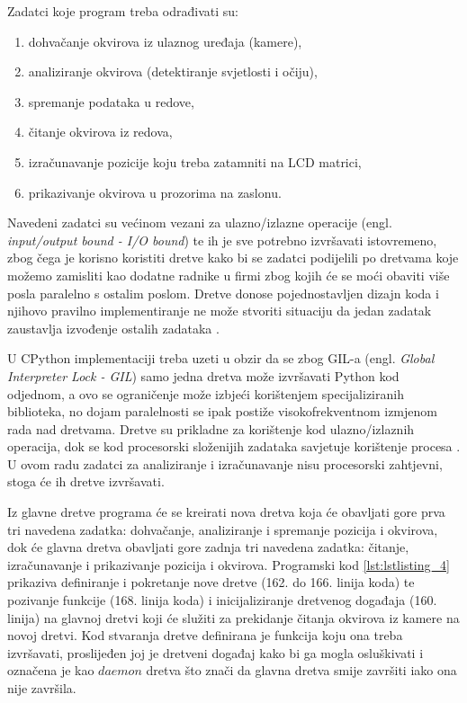 \documentclass{foi}
\begin{document}
\flushleft Zadatci koje program treba odrađivati su:
\begin{enumerate}[noitemsep]
    \item dohvačanje okvirova iz ulaznog uređaja (kamere),
    \item analiziranje okvirova (detektiranje svjetlosti i očiju),
    \item spremanje podataka u redove,
    \item čitanje okvirova iz redova,
    \item izračunavanje pozicije koju treba zatamniti na LCD matrici,
    \item prikazivanje okvirova u prozorima na zaslonu.
\end{enumerate}

\justifying

Navedeni zadatci su većinom vezani za ulazno/izlazne operacije (engl. \emph{input/output bound - I/O bound}) te ih je sve potrebno izvršavati istovremeno, zbog čega je korisno koristiti dretve kako bi se zadatci podijelili po dretvama koje možemo zamisliti kao dodatne radnike u firmi zbog kojih će se moći obaviti više posla paralelno s ostalim poslom. Dretve donose pojednostavljen dizajn koda i njihovo pravilno implementiranje ne može stvoriti situaciju da jedan zadatak zaustavlja izvođenje ostalih zadataka \cite{AndersonJim}.

U CPython implementaciji treba uzeti u obzir da se zbog GIL-a (engl. \emph{Global Interpreter Lock - GIL}) samo jedna dretva može izvršavati Python kod odjednom, a ovo se ograničenje može izbjeći korištenjem specijaliziranih biblioteka, no dojam paralelnosti se ipak postiže visokofrekventnom izmjenom rada nad dretvama. Dretve su prikladne za korištenje kod ulazno/izlaznih operacija, dok se kod procesorski složenijih zadataka savjetuje korištenje procesa \cite{PythonSoftwareFoundation2}. U ovom radu zadatci za analiziranje i izračunavanje nisu procesorski zahtjevni, stoga će ih dretve izvršavati.

Iz glavne dretve programa će se kreirati nova dretva koja će obavljati gore prva tri navedena zadatka: dohvačanje, analiziranje i spremanje pozicija i okvirova, dok će glavna dretva obavljati gore zadnja tri navedena zadatka: čitanje, izračunavanje i prikazivanje pozicija i okvirova. Programski kod \ref{lst:lstlisting_4} prikaziva definiranje i pokretanje nove dretve (162. do 166. linija koda) te pozivanje funkcije (168. linija koda) i inicijaliziranje dretvenog događaja (160. linija) na glavnoj dretvi koji će služiti za prekidanje čitanja okvirova iz kamere na novoj dretvi. Kod stvaranja dretve definirana je funkcija koju ona treba izvršavati, proslijeđen joj je dretveni događaj kako bi ga mogla osluškivati i označena je kao $daemon$ dretva što znači da glavna dretva smije završiti iako ona nije završila.
\end{document}
